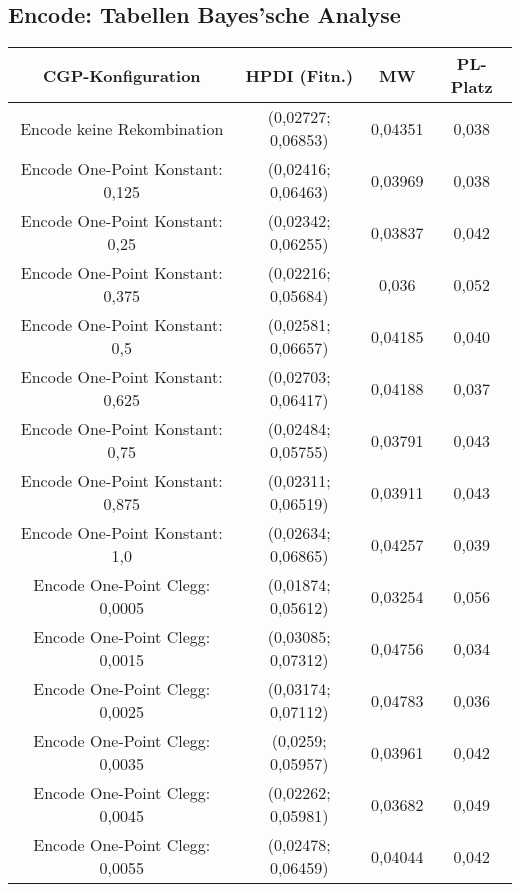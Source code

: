 \subsection{Encode: Tabellen Bayes'sche Analyse}
\label{subsec:appendixTabellesnBayesEncode}
 \begin{table}[H]
	\centering
	\begin{tabular}{c | c | c | c}
		\textbf{CGP-Konfiguration} & \textbf{HPDI (Fitn.)} & \textbf{MW} & \textbf{PL-Platz}\\
		\hline
		Encode keine Rekombination & (0,02727; 0,06853) & \color{red}0,04351\color{black} & 0,038\\
		\hline
		\hline
		Encode One-Point Konstant: 0,125 & (0,02416; 0,06463) & 0,03969 & 0,038\\
		\hline
		Encode One-Point Konstant: 0,25 & (0,02342; 0,06255) & 0,03837 & 0,042\\
		\hline
		Encode One-Point Konstant: 0,375 & (0,02216; 0,05684) & \color{Green}0,036\color{black} & \color{Green}0,052\color{black}\\
		\hline
		Encode One-Point Konstant: 0,5 & (0,02581; 0,06657) & 0,04185 & 0,040\\
		\hline
		Encode One-Point Konstant: 0,625 & (0,02703; 0,06417) & 0,04188 & 0,037\\
		\hline
		Encode One-Point Konstant: 0,75 & \color{Green}(0,02484; 0,05755)\color{black} & 0,03791 & 0,043\\
		\hline
		Encode One-Point Konstant: 0,875 & (0,02311; 0,06519) & 0,03911 & 0,043\\
		\hline
		Encode One-Point Konstant: 1,0 & \color{red}(0,02634; 0,06865)\color{black} & 0,04257 & 0,039\\
		\hline
		\hline
		Encode One-Point Clegg: 0,0005 & (0,01874; 0,05612) & \color{Green}0,03254\color{black} & \color{Green}0,056\color{black}\\
		\hline
		Encode One-Point Clegg: 0,0015 & \color{red}(0,03085; 0,07312)\color{black} & \color{red}0,04756\color{black} & \color{red}0,034\color{black}\\
		\hline
		Encode One-Point Clegg: 0,0025 & (0,03174; 0,07112) & \color{red}0,04783\color{black} & \color{red}0,036\color{black}\\
		\hline
		Encode One-Point Clegg: 0,0035 & (0,0259; 0,05957) & 0,03961 & 0,042\\
		\hline
		Encode One-Point Clegg: 0,0045 & (0,02262; 0,05981) & 0,03682 & 0,049\\
		\hline
		Encode One-Point Clegg: 0,0055 & (0,02478; 0,06459) & 0,04044 & 0,042\\

\end{tabular}
\end{table}
